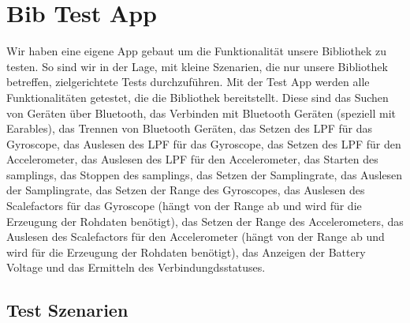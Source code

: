 \documentclass[a4paper,12pt]{article}
\begin{document}
\section{Bib Test App}



Wir haben eine eigene App gebaut um die Funktionalität unsere Bibliothek zu testen. So sind wir in der Lage, mit kleine Szenarien, die nur unsere Bibliothek betreffen, zielgerichtete Tests durchzuführen.
Mit der Test App werden alle Funktionalitäten getestet, die die Bibliothek bereitstellt. Diese sind das Suchen von Geräten über Bluetooth, das Verbinden mit Bluetooth Geräten (speziell mit Earables), das Trennen von Bluetooth Geräten, das Setzen des LPF für das Gyroscope, das Auslesen des LPF für das Gyroscope, das Setzen des LPF für den Accelerometer, das Auslesen des LPF für den Accelerometer, das Starten des samplings, das Stoppen des samplings, das Setzen der Samplingrate, das Auslesen der Samplingrate, das Setzen der Range des Gyroscopes, das Auslesen des Scalefactors für das Gyroscope (hängt von der Range ab und wird für die Erzeugung der Rohdaten benötigt), das Setzen der Range des Accelerometers, das Auslesen des Scalefactors für den Accelerometer (hängt von der Range ab und wird für die Erzeugung der Rohdaten benötigt), das Anzeigen der Battery Voltage und das Ermitteln des Verbindungdsstatuses.

\subsection{Test Szenarien}
\end{document}
